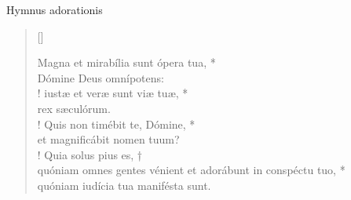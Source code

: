 


\def\greinitialformat#1{%
{\fontsize{39}{39}\selectfont #1}%
}




\vspace{0.3cm}
\begin{center}

Hymnus adorationis\\
\end{center}
\begin{verse}[\versewidth]

Magna et mirabília sunt ópera tua, *\\
Dómine Deus omnípotens:\\!
\vin iustæ et veræ sunt viæ tuæ, *\\
\vin rex sæculórum.\\!
Quis non timébit te, Dómine, *\\
et magnificábit nomen tuum?\\!
\vin Quia solus pius es, †\\
\vin quóniam omnes gentes vénient
	et adorábunt in conspéctu tuo, *\\
\vin quóniam iudícia tua manifésta sunt.\\
\end{verse}
\vspace{1cm}


